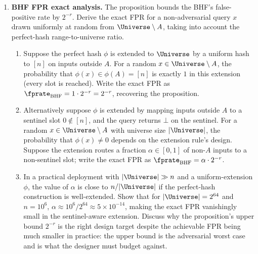 \begin{enumerate}
\item \exstarstarstar
\label{ex:ch14-9}
\textbf{BHF FPR exact analysis.}
The proposition  bounds the BHF's false-positive
rate by $2^{-r}$. Derive the exact FPR for a non-adversarial query
$x$ drawn uniformly at random from $\Universe \setminus A$, taking
into account the perfect-hash range-to-universe ratio.
\begin{enumerate}
  \item[(a)] Suppose the perfect hash $\phi$ is extended to
    $\Universe$ by a uniform hash to $[n]$ on inputs outside $A$.
    For a random $x \in \Universe \setminus A$, the probability
    that $\phi(x) \in \phi(A) = [n]$ is exactly $1$ in this
    extension (every slot is reached). Write the exact FPR as
    $\fprate_{\text{BHF}} = 1 \cdot 2^{-r} = 2^{-r}$, recovering
    the proposition.
  \item[(b)] Alternatively suppose $\phi$ is extended by mapping
    inputs outside $A$ to a sentinel slot $0 \notin [n]$, and the
    query returns $\bot$ on the sentinel. For a random $x \in
    \Universe \setminus A$ with universe size $|\Universe|$, the
    probability that $\phi(x) \neq 0$ depends on the extension
    rule's design. Suppose the extension routes a fraction
    $\alpha \in [0, 1]$ of non-$A$ inputs to a non-sentinel slot;
    write the exact FPR as $\fprate_{\text{BHF}} = \alpha \cdot
    2^{-r}$.
  \item[(c)] In a practical deployment with $|\Universe| \gg n$
    and a uniform-extension $\phi$, the value of $\alpha$ is close
    to $n / |\Universe|$ if the perfect-hash construction is
    well-extended. Show that for $|\Universe| = 2^{64}$ and $n =
    10^6$, $\alpha \approx 10^6 / 2^{64} \approx 5 \times 10^{-14}$,
    making the exact FPR vanishingly small in the sentinel-aware
    extension. Discuss why the proposition's upper bound $2^{-r}$
    is the right design target despite the achievable FPR being
    much smaller in practice: the upper bound is the adversarial
    worst case and is what the designer must budget against.
\end{enumerate}


\end{enumerate}
